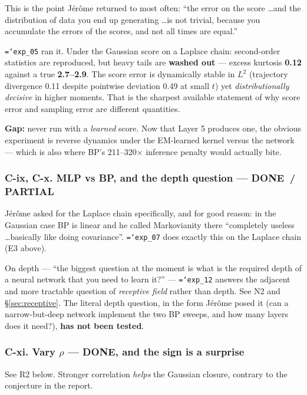 \documentclass[11pt,a4paper]{article}
\newcommand{\done}{\textcolor{GoodGreen}{\textbf{DONE}}}
\newcommand{\partialx}{\textcolor{WarnAmber}{\textbf{PARTIAL}}}
\newcommand{\code}[1]{\texttt{\small\hyphenchar\font=`\-\relax #1}}
\begin{document}
This is the point J\'er\^ome returned to most often: ``the error on the score \dots and the
distribution of data you end up generating \dots is not trivial, because you accumulate the
errors of the scores, and not all times are equal.''

\code{exp\_05} ran it. Under the Gaussian score on a Laplace chain: second-order statistics
are reproduced, but heavy tails are \textbf{washed out} --- excess kurtosis \textbf{0.12}
against a true \textbf{2.7--2.9}. The score error is dynamically stable in $L^2$ (trajectory
divergence 0.11 despite pointwise deviation 0.49 at small $t$) yet \emph{distributionally
decisive} in higher moments. That is the sharpest available statement of why score error and
sampling error are different quantities.

\textbf{Gap:} never run with a \emph{learned} score. Now that Layer 5 produces one, the
obvious experiment is reverse dynamics under the EM-learned kernel versus the network ---
which is also where BP's 211--320$\times$ inference penalty would actually bite.

\subsubsection*{C-ix, C-x. MLP vs BP, and the depth question --- \done\ / \partialx}

J\'er\^ome asked for the Laplace chain specifically, and for good reason: in the Gaussian
case BP is linear and he called Markovianity there ``completely useless \dots basically like
doing covariance''. \code{exp\_07} does exactly this on the Laplace chain (E3 above).

On depth --- ``the biggest question at the moment is what is the required depth of a neural
network that you need to learn it?'' --- \code{exp\_12} answers the adjacent and more
tractable question of \emph{receptive field} rather than depth. See N2 and
\S\ref{sec:receptive}. The literal depth question, in the form J\'er\^ome posed it (can a
narrow-but-deep network implement the two BP sweeps, and how many layers does it need?),
\textbf{has not been tested}.

\subsubsection*{C-xi. Vary $\rho$ --- \done, and the sign is a surprise}

See R2 below. Stronger correlation \emph{helps} the Gaussian closure, contrary to the
conjecture in the report.
\end{document}
